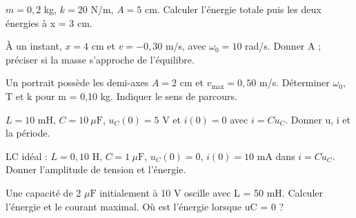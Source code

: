 \begin{questions}
\item $m=0{,}2$ kg, $k=20$ N/m, $A=5$ cm. Calculer l’énergie totale puis les deux énergies à x = 3 cm.
\end{questions}

\begin{questions}
\item À un instant, $x=4$ cm et $v=-0{,}30$ m/s, avec $\omega_0=10$ rad/s. Donner A ; préciser si la masse s’approche de l’équilibre.
\end{questions}

\begin{questions}
\item Un portrait possède les demi-axes $A=2$ cm et $v_{\max}=0{,}50$ m/s. Déterminer $\omega_0$, T et k pour m = 0,10 kg. Indiquer le sens de parcours.
\end{questions}



\begin{questions}
\item $L=10$ mH, $C=10\ \mu\mathrm{ F}$, $u_C(0)=5$ V et $i(0)=0$ avec $i=C\dot u_C$. Donner u, i et la période.
\end{questions}

\begin{questions}
\item LC idéal : $L=0{,}10$ H, $C=1\ \mu\mathrm{ F}$, $u_C(0)=0$, $i(0)=10$ mA dans $i=C\dot u_C$. Donner l’amplitude de tension et l’énergie.
\end{questions}

\begin{questions}
\item Une capacité de 2 $\mu\mathrm{ F}$ initialement à 10 V oscille avec L = 50 mH. Calculer l’énergie et le courant maximal. Où est l’énergie lorsque uC = 0 ?
\end{questions}



